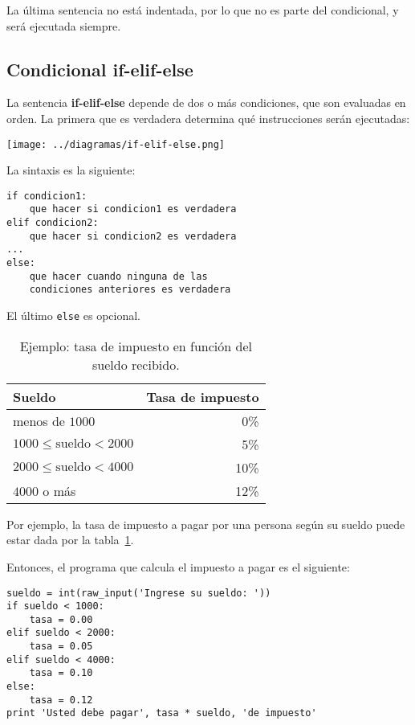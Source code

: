 La última sentencia no está indentada, por lo que no es parte del
condicional, y será ejecutada siempre.

\subsection{Condicional if-elif-else}

La sentencia \textbf{if-elif-else} depende de dos o más condiciones, que
son evaluadas en orden. La primera que es verdadera determina qué
instrucciones serán ejecutadas:

\texttt{[image: ../diagramas/if-elif-else.png]}

La sintaxis es la siguiente:

\begin{lstlisting}
if condicion1:
    que hacer si condicion1 es verdadera
elif condicion2:
    que hacer si condicion2 es verdadera
...
else:
    que hacer cuando ninguna de las
    condiciones anteriores es verdadera
\end{lstlisting}

El último \lstinline!else! es opcional.

\begin{table}
  \centering
  \begin{tabular}{lr}
    \toprule
      Sueldo & Tasa de impuesto \\
    \midrule
      menos de \(1000\)                 &  0\% \\
      \(1000 \le \text{sueldo} < 2000\) &  5\% \\
      \(2000 \le \text{sueldo} < 4000\) & 10\% \\
      \(4000\) o más                    & 12\% \\
    \bottomrule
  \end{tabular}
  \caption{Ejemplo: tasa de impuesto en función del sueldo recibido.}
  \label{tbl:tasa-impuesto}
\end{table}

Por ejemplo, la tasa de impuesto a pagar por una persona según su sueldo
puede estar dada por la tabla~\ref{tbl:tasa-impuesto}.

Entonces, el programa que calcula el impuesto a pagar es el siguiente:

\begin{lstlisting}
sueldo = int(raw_input('Ingrese su sueldo: '))
if sueldo < 1000:
    tasa = 0.00
elif sueldo < 2000:
    tasa = 0.05
elif sueldo < 4000:
    tasa = 0.10
else:
    tasa = 0.12
print 'Usted debe pagar', tasa * sueldo, 'de impuesto'
\end{lstlisting}

